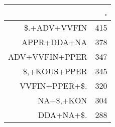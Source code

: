 \begin{tabular}{rr}
  \hline
 & . \\ 
  \hline
\$.+ADV+VVFIN & 415 \\ 
  APPR+DDA+NA & 378 \\ 
  ADV+VVFIN+PPER & 347 \\ 
  \$,+KOUS+PPER & 345 \\ 
  VVFIN+PPER+\$. & 320 \\ 
  NA+\$,+KON & 304 \\ 
  DDA+NA+\$. & 288 \\ 
   \hline
\end{tabular}
